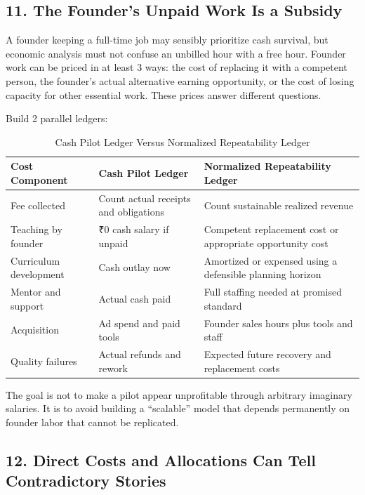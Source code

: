 \subsection*{11. The Founder's Unpaid Work Is a Subsidy}

A founder keeping a full-time job may sensibly prioritize cash survival, but economic analysis must not confuse an unbilled hour with a free hour. Founder work can be priced in at least 3 ways: the cost of replacing it with a competent person, the founder's actual alternative earning opportunity, or the cost of losing capacity for other essential work. These prices answer different questions.

Build 2 parallel ledgers:

\begin{table}[t]
\centering
\small
\caption{Cash Pilot Ledger Versus Normalized Repeatability Ledger}
\begin{tabularx}{\textwidth}{p{}p{}X}
\toprule
\textbf{Cost Component} & \textbf{Cash Pilot Ledger} & \textbf{Normalized Repeatability Ledger} \\
\midrule
Fee collected & Count actual receipts and obligations & Count sustainable realized revenue \\
Teaching by founder & ₹0 cash salary if unpaid & Competent replacement cost or appropriate opportunity cost \\
Curriculum development & Cash outlay now & Amortized or expensed using a defensible planning horizon \\
Mentor and support & Actual cash paid & Full staffing needed at promised standard \\
Acquisition & Ad spend and paid tools & Founder sales hours plus tools and staff \\
Quality failures & Actual refunds and rework & Expected future recovery and replacement costs \\
\bottomrule
\end{tabularx}
\end{table}

The goal is not to make a pilot appear unprofitable through arbitrary imaginary salaries. It is to avoid building a ``scalable'' model that depends permanently on founder labor that cannot be replicated.

\subsection*{12. Direct Costs and Allocations Can Tell Contradictory Stories}

